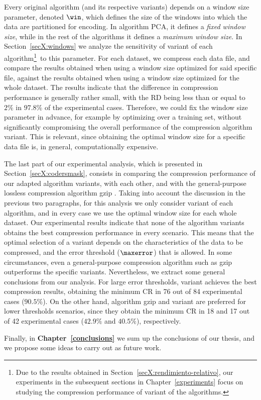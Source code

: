 \newcommand{\footSupportFocus}{\footnote{\label{note1}Due to the results obtained in Section~\ref{secX:rendimiento-relativo}, our experiments in the subsequent sections in Chapter~\ref{experiments} focus on studying the compression performance of variant \maskalgo of the algorithms.}}


Every original algorithm (and its respective variants) depends on a window size parameter, denoted $\win$, which defines the size of the windows into which the data are partitioned for encoding. In algorithm PCA, it defines a \textit{fixed window size}, while in the rest of the algorithms it defines a \textit{maximum window size}. In Section~\ref{secX:windows} we analyze the sensitivity of variant \maskalgo of each algorithm\footSupportFocus\ to this parameter. For each dataset, we compress each data file, and compare the results obtained when using a window size optimized for said specific file, against the results obtained when using a window size optimized for the whole dataset. The results indicate that the difference in compression performance is generally rather small, with the RD being less than or equal to $2\%$ in $97.8\%$ of the experimental cases. Therefore, we could fix the window size parameter in advance, for example by optimizing over a training set, without significantly compromising the overall performance of the compression algorithm variant. This is relevant, since obtaining the optimal window size for a specific data file is, in general, computationally expensive.


The last part of our experimental analysis, which is presented in Section~\ref{secX:codersmask}, consists in comparing the compression performance of our adapted algorithm variants, with each other, and with the general-purpose lossless compression algorithm gzip \cite{gzip}. Taking into account the discussion in the previous two paragraphs, for this analysis we only consider variant \maskalgo of each algorithm, and in every case we use the optimal window size for each whole dataset. Our experimental results indicate that none of the algorithm variants obtains the best compression performance in every scenario. This means that the optimal selection of a variant depends on the characteristics of the data to be compressed, and the error threshold ($\maxerror$) that is allowed. In some circumstances, even a general-purpose compression algorithm such as gzip outperforms the specific variants. Nevertheless, we extract some general conclusions from our analysis. For large error thresholds, variant  achieves the best compression results, obtaining the minimum CR in 76 out of 84 experimental cases ($90.5\%$). On the other hand, algorithm gzip and variant  are preferred for lower thresholds scenarios, since they obtain the minimum CR in 18 and 17 out of 42 experimental cases ($42.9\%$ and $40.5\%$), respectively.


Finally, in \textbf{Chapter~\ref{conclusions}} we sum up the conclusions of our thesis, and we propose some ideas to carry out as future work.

